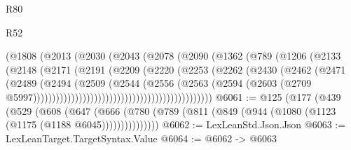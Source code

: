 \begin{lexlean}{R80}
\begin{lexlean}{R52}
\begin{coremodule}
{{{{{{{{{{{{{{{{{{{{{{{{{{{{{{{{{{{{{{{{{{{{{{{{{{{{{{{{{{{{{{{{{{{{{{{{{{{{{{{{{{{{{{{{{{{{{{{{{{{{{{{{{{{{{{{{{{{{{{{{{{{{{{{{{{{{{{{{{{{{{{{{{{{{{{{{{{{{{{{{{{{{{{{{{{{{{{{{{{{{{{{{{{{{{{{{{{{{{{                                        (@1808
                                          (@2013
                                            (@2030
                                              (@2043
                                                (@2078
                                                  (@2090
                                                    (@1362
                                                      (@789
                                                        (@1206
                                                          (@2133
                                                            (@2148
                                                              (@2171
                                                                (@2191
                                                                  (@2209
                                                                    (@2220
                                                                      (@2253
                                                                        (@2262
                                                                          (@2430
                                                                            (@2462
                                                                              (@2471
                                                                                (@2489
                                                                                  (@2494
                                                                                    (@2509
                                                                                      (@2544
                                                                                        (@2556
                                                                                          (@2563
                                                                                            (@2594
                                                                                              (@2603
                                                                                                (@2709
                                                                                                  @5997)))))))))))))))))))))))))))))))))))))))))))))))
@6061 := @125
    (@177
      (@439
        (@529
          (@608
            (@647
              (@666 (@780 (@789 (@811 (@849 (@944 (@1080 (@1123 (@1175 (@1188 @6045)))))))))))))))
@6062 := LexLeanStd.Json.Json
@6063 := LexLeanTarget.TargetSyntax.Value
@6064 := @6062 -> @6063
}}}}}}}}}}}}}}}}}}}}}}}}}}}}}}}}}}}}}}}}}}}}}}}}}}}}}}}}}}}}}}}}}}}}}}}}}}}}}}}}}}}}}}}}}}}}}}}}}}}}}}}}}}}}}}}}}}}}}}}}}}}}}}}}}}}}}}}}}}}}}}}}}}}}}}}}}}}}}}}}}}}}}}}}}}}}}}}}}}}}}}}}}}}}}}}}}}}}}}
\end{coremodule}
\end{lexlean}
\end{lexlean}
